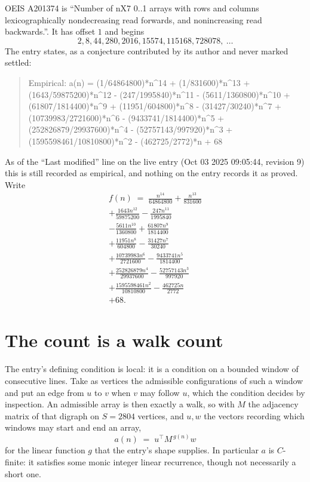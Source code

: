 \documentclass[11pt,a4paper]{article}
\theoremstyle{plain}
\theoremstyle{definition}
\begin{document}
OEIS A201374 is ``Number of nX7 0..1 arrays with rows and columns lexicographically nondecreasing read forwards, and nonincreasing read backwards.''. It has offset $1$ and begins
\[
2, 8, 44, 280, 2016, 15574, 115168, 728078,\ \dots
\]
The entry states, as a conjecture contributed by its author and never marked settled:
\begin{quote}
Empirical: a(n) = (1/64864800)*n\^{}14 + (1/831600)*n\^{}13 + (1643/59875200)*n\^{}12 - (247/1995840)*n\^{}11 - (5611/1360800)*n\^{}10 + (61807/1814400)*n\^{}9 + (11951/604800)*n\^{}8 - (31427/30240)*n\^{}7 + (10739983/2721600)*n\^{}6 - (9433741/1814400)*n\^{}5 + (252826879/29937600)*n\^{}4 - (52757143/997920)*n\^{}3 + (1595598461/10810800)*n\^{}2 - (462725/2772)*n + 68
\end{quote}
As of the ``Last modified'' line on the live entry (Oct 03 2025 09:05:44, revision 9) this is still
recorded as empirical, and nothing on the entry records it as proved. Write
\begin{multline*}
f(n)\;=\;\frac{n^{14}}{64864800} + \frac{n^{13}}{831600} \\
+ \frac{1643 n^{12}}{59875200} - \frac{247 n^{11}}{1995840} \\
- \frac{5611 n^{10}}{1360800} + \frac{61807 n^{9}}{1814400} \\
+ \frac{11951 n^{8}}{604800} - \frac{31427 n^{7}}{30240} \\
+ \frac{10739983 n^{6}}{2721600} - \frac{9433741 n^{5}}{1814400} \\
+ \frac{252826879 n^{4}}{29937600} - \frac{52757143 n^{3}}{997920} \\
+ \frac{1595598461 n^{2}}{10810800} - \frac{462725 n}{2772} \\
+ 68.
\end{multline*}

\section{The count is a walk count}

The entry's defining condition is local: it is a condition on a bounded window of consecutive lines. Take as vertices the
admissible configurations of such a window and put an edge from $u$ to $v$ when $v$ may
follow $u$, which the condition decides by inspection. An admissible array is then exactly a
walk, so with $M$ the adjacency matrix of that digraph on $S=2804$ vertices, and $u,w$ the
vectors recording which windows may start and end an array,
\[
a(n)\;=\;u^{\!\top}M^{\,g(n)}w
\]
for the linear function $g$ that the entry's shape supplies. In particular $a$ is
$C$-finite: it satisfies some monic integer linear recurrence, though not necessarily a short
one.
\end{document}

